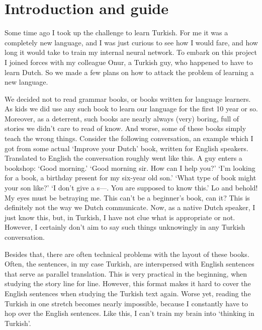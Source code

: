 

\section{Introduction and guide}
\label{sec:introduction-guide}

Some time ago I took up the challenge to learn Turkish. For me it was a completely new language, and I was just curious to see how I would fare, and how long it would take to train my internal neural network. To embark on this project I joined forces with my colleague Onur, a Turkish guy, who happened to have to learn Dutch. So we made a few plans on how to attack the problem of learning a new language.

We decided not to read grammar books, or books written for language learners. As kids we did use any such book to learn our language for the first 10 year or so. Moreover, as a deterrent, such books are nearly always (very) boring, full of stories we didn't care to read of know. And worse, some of these books simply teach the wrong things. Consider the following  conversation, an example which I got from some actual `Improve your Dutch' book, written for English speakers. Translated to English the conversation roughly went like this. A guy enters a bookshop: `Good morning.' `Good morning sir. How can I help you?' `I'm looking for a book, a birthday present for  my six-year old son.' `What type of book might your son like?' `I don't give a s---. You are supposed to know this.' Lo and behold! My eyes must  be betraying me. This can't be a beginner's book, can it? This is definitely not the way we Dutch communicate. Now, as a native Dutch speaker, I  just know  this, but, in Turkish, I have not clue what is appropriate or not. However, I certainly don't aim to say such things unknowingly  in any Turkish conversation. 


Besides that, there are often technical problems with the layout of these books. Often, the sentences, in my case Turkish, are interspersed with  English sentences that serve as parallel translation. This is very practical in the beginning, when studying the story line for line. However,  this format makes it hard to cover the English sentences when studying the Turkish text again. Worse yet,  reading the Turkish in one stretch becomes nearly impossible, because I  constantly have to hop over the English sentences. Like this, I can't train my brain into `thinking in Turkish'. 

